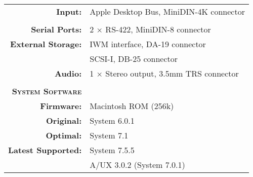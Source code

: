 \begin{tabular}{ r p{6in} }
\textbf{Input:} & Apple Desktop Bus, MiniDIN-4K connector \\
\\
\textbf{Serial Ports:} & 2 \(\times\) RS-422, MiniDIN-8 connector \\
\textbf{External Storage:} & IWM interface, DA-19 connector \\
~ & SCSI-I, DB-25 connector \\
\textbf{Audio:} & 1 \(\times\) Stereo output, 3.5mm TRS connector \\
\\
\textbf{\textsc{System Software}} & ~ \\
\textbf{Firmware:} & Macintosh ROM (256k) \\
\textbf{Original:} & System 6.0.1 \\
\textbf{Optimal:} & System 7.1 \\
\textbf{Latest Supported:} & System 7.5.5 \\
~ & A/UX 3.0.2 (System 7.0.1) \\
\end{tabular}